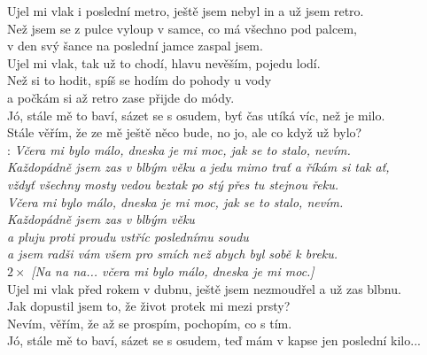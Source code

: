 
\begin{Large}

Ujel mi vlak i poslední metro, ještě jsem nebyl in a už jsem retro.\\
Než jsem se z pulce vyloup v samce, co má všechno pod palcem,\\
v den svý šance na poslední jamce zaspal jsem.\\

Ujel mi vlak, tak už to chodí, hlavu nevěším, pojedu lodí.\\
Než si to hodit, spíš se hodím do pohody u vody\\
a počkám si až retro zase přijde do módy.\\

Jó, stále mě to baví, sázet se s osudem, byť čas utíká víc, než je milo.\\
Stále věřím, že ze mě ještě něco bude, no jo, ale co když už bylo?\\

\textregistered: \emph{Včera mi bylo málo, dneska je mi moc,
jak se to stalo, nevím.\\
Každopádně jsem zas v blbým věku a jedu mimo trať a říkám si tak ať,\\
vždyť všechny mosty vedou beztak po stý přes tu stejnou řeku.}\\

\emph{Včera mi bylo málo, dneska je mi moc, jak se to stalo, nevím.\\
Každopádně jsem zas v blbým věku\\
a pluju proti proudu vstříc poslednímu soudu\\
a jsem radši vám všem pro smích než abych byl sobě k breku.}\\

$2\times$ \emph{[Na na na... včera mi bylo málo, dneska je mi moc.]}\\

Ujel mi vlak před rokem v dubnu, ještě jsem nezmoudřel a už zas blbnu.\\
Jak dopustil jsem to, že život protek mi mezi prsty?\\
Nevím, věřím, že až se prospím, pochopím, co s tím.\\
Jó, stále mě to baví, sázet se s osudem, teď mám v kapse jen poslední kilo...\\

\textregistered \textregistered

\end{Large}

\newpage
